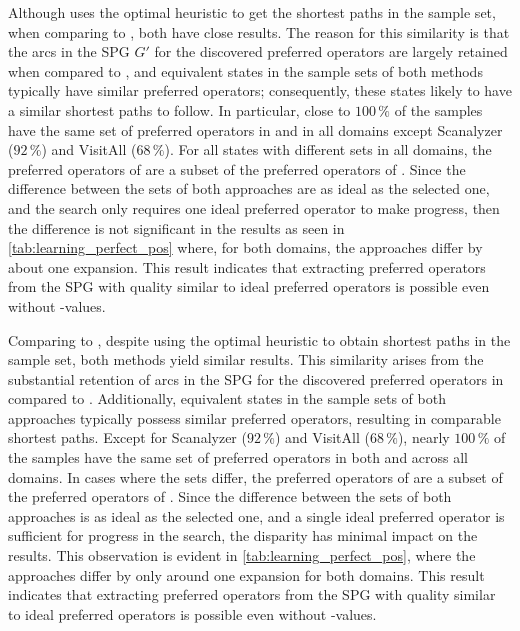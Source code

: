 \documentclass[ppgc,diss,english]{iiufrgs}
\begin{document}
Although \pogstar uses the optimal heuristic \hstar to get the shortest paths in the sample set, when comparing to \pog, both have close results. The reason for this similarity is that the arcs in the SPG $G'$ for the discovered preferred operators \pog are largely retained when compared to \pogstar, and equivalent states in the sample sets of both methods typically have similar preferred operators; consequently, these states likely to have a similar shortest paths to follow. In particular, close to $100\,\%$ of the samples have the same set of preferred operators in \pogstar and \pog in all domains except Scanalyzer ($92\,\%$) and VisitAll ($68\,\%$). For all states with different sets in all domains, the preferred operators of \pog are a subset of the preferred operators of \pogstar. Since the difference between the sets of both approaches are as ideal as the selected one, and the search only requires one ideal preferred operator to make progress, then the difference is not significant in the results as seen in \cref{tab:learning_perfect_pos} where, for both domains, the approaches differ by about one expansion. This result indicates that extracting preferred operators from the SPG with quality similar to ideal preferred operators is possible even without \hstar-values.

Comparing \pogstar to \pog, despite \pogstar using the optimal heuristic \hstar to obtain shortest paths in the sample set, both methods yield similar results. This similarity arises from the substantial retention of arcs in the SPG for the discovered preferred operators in \pog compared to \pogstar. Additionally, equivalent states in the sample sets of both approaches typically possess similar preferred operators, resulting in comparable shortest paths. Except for Scanalyzer ($92\,\%$) and VisitAll ($68\,\%$), nearly $100\,\%$ of the samples have the same set of preferred operators in both \pogstar and \pog across all domains. In cases where the sets differ, the preferred operators of \pog are a subset of the preferred operators of \pogstar. Since the difference between the sets of both approaches is as ideal as the selected one, and a single ideal preferred operator is sufficient for progress in the search, the disparity has minimal impact on the results. This observation is evident in \cref{tab:learning_perfect_pos}, where the approaches differ by only around one expansion for both domains. This result indicates that extracting preferred operators from the SPG with quality similar to ideal preferred operators is possible even without \hstar-values.
\end{document}
